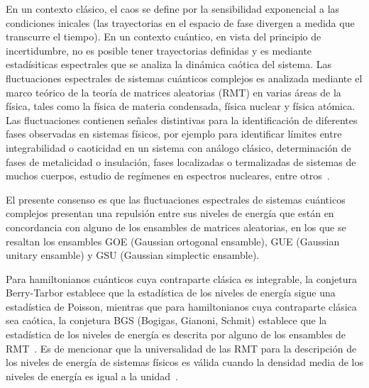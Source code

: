 \documentclass[spanish,titlepage,table]{practicas}
\begin{document}
En un contexto clásico, el caos se define por la sensibilidad exponencial a las condiciones inicales 
(las trayectorias en el espacio de fase divergen a medida que transcurre el tiempo). En un contexto cuántico, en vista del principio de incertidumbre, no es posible tener 
trayectorias definidas y es mediante estadísiticas espectrales que se analiza la dinámica caótica del sistema.
Las fluctuaciones espectrales de sistemas cuánticos complejos es analizada mediante 
el marco teórico de la teoría de matrices aleatorias (RMT) en varias áreas de la física, 
tales como la física de materia condensada, física nuclear y física atómica.
Las fluctuaciones contienen señales distintivas para la identificación de diferentes fases observadas 
en sistemas físicos, por ejemplo para identificar límites entre integrabilidad o caoticidad en un sistema con análogo clásico,
determinación de fases de metalicidad o insulación, fases localizadas o termalizadas de sistemas de muchos cuerpos, estudio de regímenes en espectros nucleares, entre otros~\cite{Tekur2020}.


El presente consenso es que las fluctuaciones espectrales de sistemas cuánticos complejos presentan 
una repulsión entre sus niveles de energía que están en concordancia con alguno de los ensambles de matrices 
aleatorias, en los que se resaltan los ensambles GOE (Gaussian ortogonal ensamble), GUE (Gaussian unitary ensamble) y GSU (Gaussian simplectic ensamble).


Para hamiltonianos cuánticos cuya contraparte clásica es integrable, la conjetura Berry-Tarbor establece que 
la estadística de los niveles de energía sigue una estadística de Poisson, mientras que para hamiltonianos 
cuya contraparte clásica sea caótica, la conjetura BGS (Bogigas, Gianoni, Schmit) establece que la estadística de los niveles de energía es descrita 
por alguno de los ensambles de RMT~\cite{Atas_2013}.
Es de mencionar que la universalidad de las RMT para la descripción de los niveles de energía de sistemas físicos 
es válida cuando la densidad media de los niveles de energía es igual a la unidad~\cite{Atas_2013}.
\end{document}
